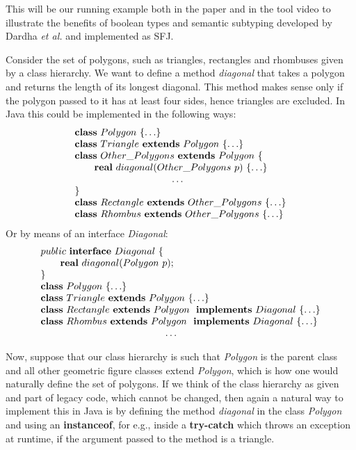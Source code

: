 \documentclass[runningheads]{llncs}
\begin{document}
\begin{example}[Polygons]
\label{polygons}
This will be our running example both in the paper and in the tool video \cite{UD20} to illustrate the benefits of boolean types and semantic subtyping developed by Dardha \emph{et al.} \cite{Dardha2013,Dardha2017} and implemented as SFJ.

Consider the set of polygons, such as triangles, rectangles and rhombuses given by a class hierarchy.
We want to define a method \emph{diagonal} that takes a polygon and returns the length of its longest diagonal. This method makes sense only if the polygon passed to it has at least four sides, hence triangles are excluded.
In Java this could be implemented in the following ways:
$$
\begin{array}{l}
\synclass Polygon \ \{ \ldots\}
\\
\syndecl{Triangle}{Polygon} {\ldots}
\\
\syndecl{Other\_Polygons}{Polygon} {
\\
	\qquad \mathbf{real}\ diagonal(Other\_Polygons \ p)\ \{\ldots \}
	\\
	\hspace{3.5cm} \ldots
	\\
}
\\
\syndecl{Rectangle}{Other\_Polygons}{\ldots}
\\
\syndecl{Rhombus}{Other\_Polygons} {\ldots}
\end{array}
$$
Or by means of an interface \emph{Diagonal}:
$$
\begin{array}{l}
public \ \syninterface Diagonal\ \{
	\\
	\qquad \mathbf{real}\ diagonal(Polygon \ p);
	\\
\}
\\
\synclass Polygon \ \{\ldots\}
\\
\syndecl{Triangle}{Polygon} {\ldots}
\\
\synidecl{Rectangle}{Polygon} \synimpl Diagonal \ \{\ldots\}
\\
\synidecl{Rhombus}{Polygon} \synimpl Diagonal \ \{\ldots\}
\\
\hspace{4.5cm} \ldots
\end{array}
$$

Now, suppose that our class hierarchy is such that \emph{Polygon} is the parent class and all other geometric figure classes extend \emph{Polygon}, which is how one would naturally define the set of polygons.
If we think of the class hierarchy as given and part of legacy code, which cannot be changed, then again a natural way to implement this in Java is by defining the method \emph{diagonal} in the class \emph{Polygon} and using an \textbf{instanceof}, for e.g., inside a \textbf{try-catch} which throws an exception at runtime, if the argument passed to the method is a triangle.


\end{example}
\end{document}
